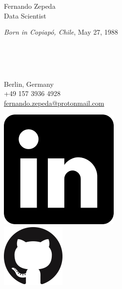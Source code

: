 \documentclass[a4paper, 12]{scrartcl}
\begin{document}
	
	\pagestyle{empty} 
	
	\begin{minipage}{0.75\textwidth}
		\begin{flushleft}
			\Large{Fernando Zepeda}\\
			\large{Data Scientist}\\[-5pt]
		\end{flushleft}
		\textcolor{newgray}{\textit{Born in Copiapó, Chile}, May 27, 1988}
		\begin{flushleft}
			\begin{minipage}{1.0\textwidth}
				\begin{flushleft}
					\begin{minipage}{0.05\textwidth}
						\faHome \\
						\faPhone \\
						\Letter \\
					\end{minipage}	
					\begin{minipage}{0.48\textwidth}
						Berlin, Germany \\
						+49 157 3936 4928 \\
						\href{mailto:fernando.zepeda@protonmail.com}{fernando.zepeda@protonmail.com}\\
					\end{minipage}
					\begin{minipage}{0.05\textwidth}
					    \includegraphics[width=0.4\linewidth]{images/linkedin.png}\\
					     \includegraphics[width=0.4\linewidth]{images/githublogo.png}\\

\end{minipage}
\end{flushleft}
\end{minipage}
\end{flushleft}
\end{minipage}
\end{document}
